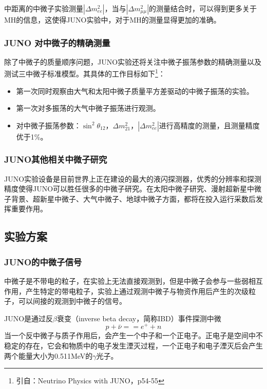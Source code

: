 \documentclass[10pt,a4paper]{article}
\begin{document}
中距离的中微子实验测量$|\Delta{m_{ee}^2}|$，当与$|\Delta{m_{\mu\mu}^2}|$的测量结合时，可以得到更多关于MH的信息，这使得JUNO实验中，对于MH的测量显得更加的准确。

\subsubsection{JUNO 对中微子的精确测量}\label{sub:logicinter}

除了中微子的质量顺序问题，JUNO实验还将关注中微子振荡参数的精确测量以及测试三中微子标准模型。其具体的工作目标如下\footnote{引自：Neutrino Physics with JUNO，p54-55}：

\begin{itemize}
	\item{第一次同时观察由大气和太阳中微子质量平方差驱动的中微子振荡的实验。}
    \item{第一次对多振荡的大气中微子振荡进行观测。}
    \item{对中微子振荡参数：$\sin^2{\theta_{12}}$，$\Delta m^2_{21}$，$|\Delta m^2_{ee}|$进行高精度的测量，且测量精度优于1\%。}
\end{itemize}


\subsubsection{JUNO其他相关中微子研究}

JUNO实验设备是目前世界上正在建设的最大的液闪探测器，优秀的分辨率和探测精度使得JUNO可以胜任很多的中微子研究。在太阳中微子研究、漫射超新星中微子背景、超新星中微子、大气中微子、地球中微子方面，都将在投入运行采数后发挥重要作用。

\subsection{实验方案}\label{sub:logicinter}

\subsubsection{JUNO的中微子信号}\label{sub:logicinter}

中微子是不带电的粒子，在实验上无法直接观测到，但是中微子会参与一些弱相互作用，产生特定的带电粒子，实验上通过观测中微子与物资作用后产生的次级粒子，可以间接的观测到中微子的信号。

JUNO是通过反$\beta$衰变（inverse beta decay，简称IBD）事件探测中微$$p+\bar{\nu}==e^{+}+n$$
当一个反中微子与质子作用后，会产生一个中子和一个正电子。正电子是空间中不稳定的存在，它会和物质中的电子发生湮灭过程，一个正电子和电子湮灭后会产生两个能量大小为0.511MeV的$\gamma$光子。
\end{document}
